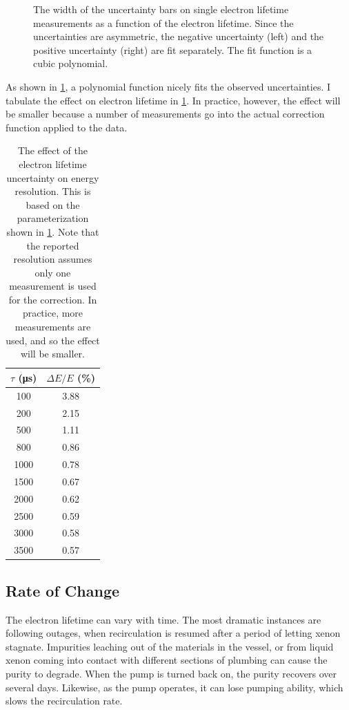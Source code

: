 \documentclass[herrin-thesis.tex]{subfiles}
\begin{document}
\begin{figure}[htd]
\begin{subfigure}[b]{0.5\linewidth}
\end{subfigure}
\caption[Fits to errors on electron lifetime measurements]{The width of the uncertainty bars on single electron lifetime measurements as a function of the electron lifetime. Since the uncertainties  are asymmetric, the negative uncertainty (left) and the positive uncertainty (right) are fit separately. The fit function is a cubic polynomial.}
\label{fig:el_err_fits}
\end{figure}

As shown in \cref{fig:el_err_fits}, a polynomial function nicely fits the observed uncertainties. I tabulate the effect on electron lifetime in \cref{tab:el_res_dtau}. In practice, however, the effect will be smaller because a number of measurements go into the actual correction function applied to the data.

\begin{table}[htd]
\centering
\begin{tabular}{c|c}
	\(\tau\) (\si{\micro\second})	&	\(\Delta E / E\) (\%) 	\\ \hline
	100					&	3.88				\\
	200					&	2.15				\\
	500					&	1.11				\\
	800					&	0.86				\\
	1000					&	0.78				\\
	1500					&	0.67				\\
	2000					&	0.62				\\
	2500					&	0.59				\\
	3000					&	0.58				\\
	3500					&	0.57
\end{tabular}
\caption[Electron lifetime uncertainty effect on resolution]{The effect of the electron lifetime uncertainty on energy resolution. This is based on the parameterization shown in \cref{fig:el_err_fits}. Note that the reported resolution assumes only one measurement is used for the correction. In practice, more measurements are used, and so the effect will be smaller.}
\label{tab:el_res_dtau}
\end{table}

\subsection{Rate of Change}
The electron lifetime can vary with time. The most dramatic instances are following outages, when recirculation is resumed after a period of letting xenon stagnate. Impurities leaching out of the materials in the vessel, or from liquid xenon coming into contact with different sections of plumbing can cause the purity to degrade. When the pump is turned back on, the purity recovers over several days. Likewise, as the pump operates, it can lose pumping ability, which slows the recirculation rate.
\end{document}
